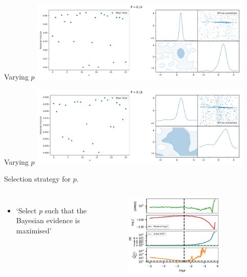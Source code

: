 \documentclass[aspectratio=169]{beamer}
\begin{document}
\begin{frame}{Varying $p$}
    \centering
    \includegraphics[width=0.8\textwidth]{images/gif_anest/comb_8.png}
\end{frame}

\begin{frame}{Varying $p$}
    \centering
    \includegraphics[width=0.8\textwidth]{images/gif_anest/comb_9.png}
\end{frame}


\begin{frame}{Selection strategy for $p$.}
  \begin{columns}
    \begin{itemize}
      \item `Select $p$ such that the Bayesian evidence is maximised'
    \end{itemize}
    \begin{figure}
      \includegraphics[width=0.8\textwidth]{images/f_approx_current_sig5_2.pdf}
    \end{figure}
  \end{columns}
\end{frame}
\end{document}
